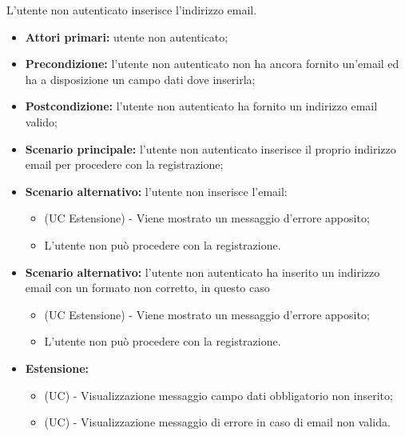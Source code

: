 L'utente non autenticato inserisce l'indirizzo email.
\begin{itemize}
	\item \textbf{Attori primari:} utente non autenticato;
	\item \textbf{Precondizione:} l'utente non autenticato non ha ancora fornito un'email ed ha a disposizione un campo dati dove inserirla;
	\item \textbf{Postcondizione:} l'utente non autenticato ha fornito un indirizzo email valido;
	\item \textbf{Scenario principale:} l'utente non autenticato inserisce il proprio indirizzo email per procedere con la registrazione;
	\item \textbf{Scenario alternativo:} l'utente non inserisce l'email:
	\begin{itemize}
		\item (UC Estensione) - Viene mostrato un messaggio d'errore apposito;
		\item L'utente non può procedere con la registrazione.
	\end{itemize}
	\item \textbf{Scenario alternativo:} l'utente non autenticato ha inserito un indirizzo email con un formato non corretto, in questo caso
	\begin{itemize}
		\item (UC Estensione) - Viene mostrato un messaggio d'errore apposito;
		\item L'utente non può procedere con la registrazione.
	\end{itemize}
	\item \textbf{Estensione:}
	\begin{itemize}
		\item (UC) - Visualizzazione messaggio campo dati obbligatorio non inserito;
		\item (UC) - Visualizzazione messaggio di errore in caso di email non valida.
	\end{itemize}
\end{itemize}

